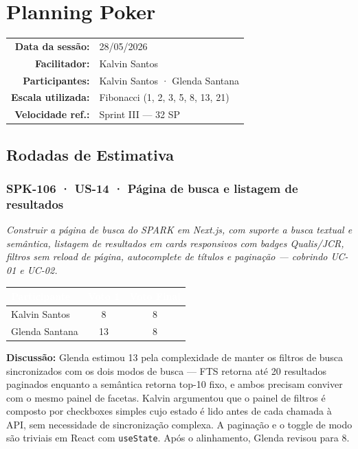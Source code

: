 \documentclass[12pt,a4paper]{article}
\begin{document}
\section{Planning Poker}

\begin{tabular}{rl}
  \textbf{Data da sessão:}   & 28/05/2026 \\
  \textbf{Facilitador:}      & Kalvin Santos \\
  \textbf{Participantes:}    & Kalvin Santos · Glenda Santana \\
  \textbf{Escala utilizada:} & Fibonacci (1, 2, 3, 5, 8, 13, 21) \\
  \textbf{Velocidade ref.:}  & Sprint III — 32 SP \\
\end{tabular}

\subsection{Rodadas de Estimativa}

\subsubsection{SPK-106 · US-14 · Página de busca e listagem de resultados}

\textit{Construir a página de busca do SPARK em Next.js, com suporte a busca textual e semântica,
listagem de resultados em cards responsivos com badges Qualis/JCR, filtros sem reload de página,
autocomplete de títulos e paginação — cobrindo UC-01 e UC-02.}

\vspace{0.3cm}
\begin{tabular}{lcc}
  \toprule
  \rowcolor{sparkblue}
  \textcolor{white}{\textbf{Participante}} &
  \textcolor{white}{\textbf{Voto 1}} &
  \textcolor{white}{\textbf{Voto Final}} \\
  \midrule
  Kalvin Santos  &  8 & 8 \\
  Glenda Santana & 13 & 8 \\
  \bottomrule
\end{tabular}

\vspace{0.2cm}
\textbf{Discussão:} Glenda estimou 13 pela complexidade de manter os filtros de busca sincronizados com
os dois modos de busca — FTS retorna até 20 resultados paginados enquanto a semântica retorna top-10 fixo,
e ambos precisam conviver com o mesmo painel de facetas. Kalvin argumentou que o painel de filtros é
composto por checkboxes simples cujo estado é lido antes de cada chamada à API, sem necessidade de
sincronização complexa. A paginação e o toggle de modo são triviais em React com \texttt{useState}.
Após o alinhamento, Glenda revisou para 8.
\end{document}
